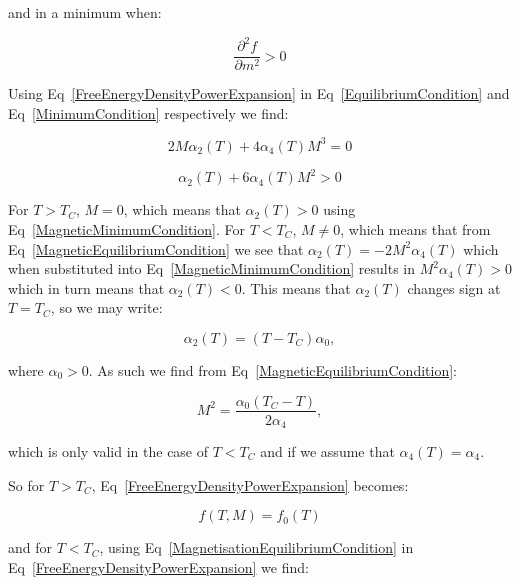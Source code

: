 \noindent and in a minimum when:

\begin{equation}
    \frac{\partial^2 f}{\partial m^2} > 0
    \label{MinimumCondition}
\end{equation}

\noindent Using Eq~\ref{FreeEnergyDensityPowerExpansion} in Eq~\ref{EquilibriumCondition} and Eq~\ref{MinimumCondition} respectively we find:

\begin{equation}
    2M\alpha_2(T) + 4\alpha_4(T)M^3 = 0
    \label{MagneticEquilibriumCondition}
\end{equation}

\begin{equation}
    \alpha_2(T) + 6\alpha_4(T)M^2 > 0
    \label{MagneticMinimumCondition}
\end{equation}

\noindent For $T > T_C$, $M = 0$, which means that $\alpha_2(T) > 0$  using Eq~\ref{MagneticMinimumCondition}. For $T < T_C$, $M \neq 0$, which means that from Eq~\ref{MagneticEquilibriumCondition} we see that $\alpha_2(T) = -2M^2\alpha_4(T)$ which when substituted into Eq~\ref{MagneticMinimumCondition} results in $M^2\alpha_4(T) > 0$ which in turn means that $\alpha_2(T) < 0$.
This means that $\alpha_2(T)$ changes sign at $T = T_C$, so we may write:

\begin{equation}
    \alpha_2(T) = (T - T_C)\alpha_0,
    \label{Alpha2Coefficient}
\end{equation}

\noindent where $\alpha_0 > 0$. As such we find from Eq~\ref{MagneticEquilibriumCondition}:

\begin{equation}
    M^2 = \frac{\alpha_0(T_C - T)}{2\alpha_4},
    \label{MagnetisationEquilibriumCondition}
\end{equation}

\noindent which is only valid in the case of $T < T_C$ and if we assume that $\alpha_4(T) = \alpha_4$.

\noindent So for $T > T_C$, Eq~\ref{FreeEnergyDensityPowerExpansion} becomes:

\begin{equation}
    f(T, M) = f_0(T)
    \label{PowerExpansionAboveTC}
\end{equation}

\noindent and for $T < T_C$, using Eq~\ref{MagnetisationEquilibriumCondition} in Eq~\ref{FreeEnergyDensityPowerExpansion} we find:

